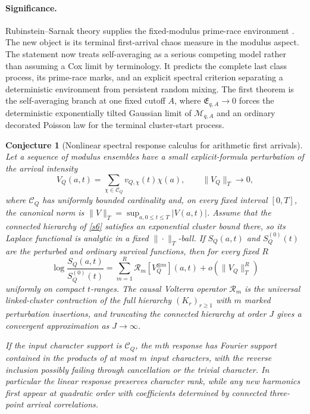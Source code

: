 \documentclass[11pt]{article}
\newtheorem{conjecture}{Conjecture}
\theoremstyle{definition}
\begin{document}
\paragraph{Significance.}
Rubinstein--Sarnak theory supplies the fixed-modulus prime-race environment
\cite{RubinsteinSarnak}.  The new object is its terminal first-arrival chaos measure in
the modulus aspect.  The statement now treats self-averaging as a serious competing
model rather than assuming a Cox limit by terminology.  It predicts the complete last
class process, its prime-race marks, and an explicit spectral criterion separating a deterministic environment from persistent random mixing. The first theorem is the self-averaging branch at one fixed cutoff $A$, where $\mathfrak E_{q,A}\to0$ forces the deterministic exponentially tilted Gaussian limit of $\mathcal M_{q,A}$ and an ordinary decorated Poisson law for the terminal cluster-start process.

\begin{conjecture}[Nonlinear spectral response calculus for arithmetic first arrivals]\label{s9}
Let a sequence of modulus ensembles have a small explicit-formula perturbation of the
arrival intensity
\[
 V_Q(a,t)=\sum_{\chi\in\mathcal C_Q}v_{Q,\chi}(t)\chi(a),
 \qquad \|V_Q\|_{T}\to0,
\]
where $\mathcal C_Q$ has uniformly bounded cardinality and, on every fixed interval
$[0,T]$, the canonical norm is
$\|V\|_T=\sup_{a,0\le t\le T}|V(a,t)|$.  Assume that the connected hierarchy of
\cref{s6} satisfies an exponential cluster bound there, so its Laplace functional is
analytic in a fixed $\|\cdot\|_T$-ball.  If $S_Q(a,t)$ and
$S_Q^{(0)}(t)$ are the perturbed and ordinary survival functions, then for every fixed
$R$
\[
 \log\frac{S_Q(a,t)}{S_Q^{(0)}(t)}
 =\sum_{m=1}^{R}\mathcal R_m[V_Q^{\otimes m}](a,t)
   +o(\|V_Q\|_{T}^{R})
\]
uniformly on compact $t$-ranges.  The causal Volterra operator $\mathcal R_m$ is the
universal linked-cluster contraction of the full hierarchy $(K_r)_{r\ge1}$ with $m$
marked perturbation insertions, and truncating the connected hierarchy at order $J$
gives a convergent approximation as $J\to\infty$.

If the input character support is $\mathcal C_Q$, the $m$th response has Fourier support contained
in the products of at most $m$ input characters, with the reverse inclusion possibly failing through cancellation or the trivial
character.  In particular the linear response preserves character rank, while any
new harmonics first appear at quadratic order with coefficients determined by connected
three-point arrival correlations.
\end{conjecture}
\end{document}
